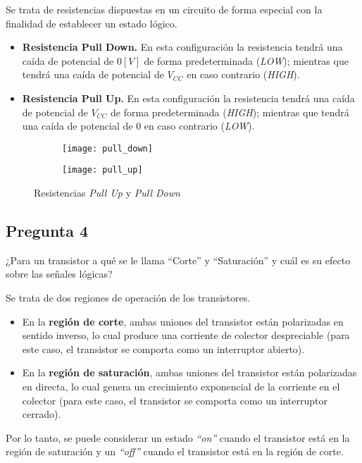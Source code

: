 \documentclass[../main.tex]{subfiles}
\begin{document}
Se trata de resistencias dispuestas en un circuito de forma especial con la 
finalidad de establecer un estado lógico.
\begin{itemize}
  \item \textbf{Resistencia Pull Down.} En esta configuración la resistencia 
    tendrá una caída de potencial de $0 [V]$ de forma predeterminada 
    (\textit{LOW}); mientras que tendrá una caída de potencial de $V_{CC}$ en 
    caso contrario (\textit{HIGH}).

  \item \textbf{Resistencia Pull Up.} En esta configuración la resistencia 
    tendrá una caída de potencial de $V_{CC}$ de forma predeterminada 
    (\textit{HIGH}); mientras que tendrá una caída de potencial de $0$ en caso 
    contrario (\textit{LOW}).
\end{itemize}

\begin{figure}[H]
  \centering
  \begin{subfigure}[b]{0.45\textwidth}
    \centering
    \texttt{[image: pull\_down]}
  \end{subfigure}
  \hfill
  \begin{subfigure}[b]{0.45\textwidth}
    \centering
    \texttt{[image: pull\_up]}
  \end{subfigure}
  \caption{Resistencias \textit{Pull Up} y \textit{Pull Down}}
\end{figure}

\subsection*{Pregunta 4}
\begin{em}
  ¿Para un transistor a qué se le llama ``Corte'' y ``Saturación'' y cuál es su 
  efecto sobre las señales lógicas?
\end{em}

Se trata de dos regiones de operación de los transistores.
\begin{itemize}
  \item En la \textbf{región de corte}, ambas uniones del transistor están 
    polarizadas en sentido inverso, lo cual produce una corriente de colector 
    despreciable (para este caso, el transistor se comporta como un 
    interruptor abierto).
  \item En la \textbf{región de saturación}, ambas uniones del transistor 
    están polarizadas en directa, lo cual genera un crecimiento exponencial de 
    la corriente en el colector (para este caso, el transistor se comporta 
    como un interruptor cerrado).
\end{itemize}
Por lo tanto, se puede considerar un estado \textit{``on''} cuando el 
transistor está en la región de saturación y un \textit{``off''} cuando el 
transistor está en la región de corte.
\end{document}
